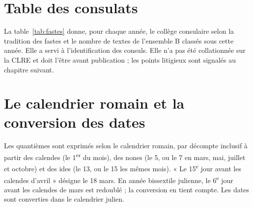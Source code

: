 \section{Table des consulats}

La table~\ref{tab:fastes} donne, pour chaque année, le collège consulaire selon la tradition des fastes et le nombre de textes de l’ensemble B classés sous cette année. Elle a servi à l’identification des consuls. Elle n’a pas été collationnée sur la CLRE et doit l’être avant publication ; les points litigieux sont signalés au chapitre suivant.



\section{Le calendrier romain et la conversion des dates}

Les quantièmes sont exprimés selon le calendrier romain, par décompte inclusif à partir des calendes (le 1\textsuperscript{er} du mois), des nones (le 5, ou le 7 en mars, mai, juillet et octobre) et des ides (le 13, ou le 15 les mêmes mois). « Le 15\textsuperscript{e} jour avant les calendes d’avril » désigne le 18 mars. En année bissextile julienne, le 6\textsuperscript{e} jour avant les calendes de mars est redoublé ; la conversion en tient compte. Les dates sont converties dans le calendrier julien.

